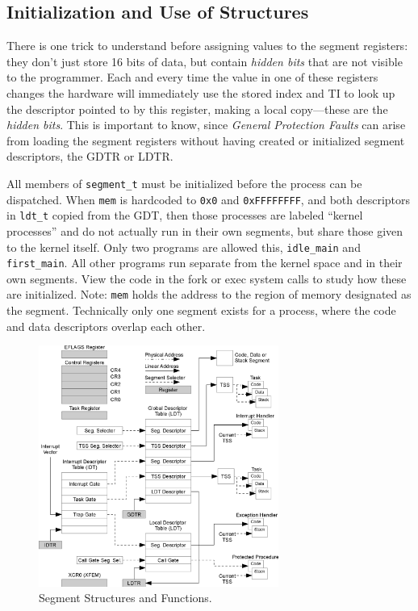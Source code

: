 \documentclass[titlepage]{article}
\begin{document}
% 
%

\subsection{Initialization and Use of Structures}

There is one trick to understand before assigning values to the segment
registers: they don't just store 16 bits of data, but contain \textit{hidden
bits} that are not visible to the programmer. Each and every time the value in
one of these registers changes the hardware will immediately use the stored
index and TI to look up the descriptor pointed to by this register, making a
local copy---these are the \textit{hidden bits}. This is important to know,
since \textit{General Protection Faults} can arise from loading the segment
registers without having created or initialized segment descriptors, the GDTR or
LDTR.

All members of \verb|segment_t| must be initialized before the process can be
dispatched. When \verb|mem| is hardcoded to \verb|0x0| and \verb|0xFFFFFFFF|,
and both descriptors in \verb|ldt_t| copied from the GDT, then those processes
are labeled ``kernel processes'' and do not actually run in their own segments,
but share those given to the kernel itself. Only two programs are allowed this,
\verb|idle_main| and \verb|first_main|. All other programs run separate from the
kernel space and in their own segments. View the code in the fork or exec system
calls to study how these are initialized. Note: \verb|mem| holds the address to
the region of memory designated as the segment. Technically only one segment
exists for a process, where the code and data descriptors overlap each other.

\begin{figure}[!ht]
    \centering
    \includegraphics[width=0.70\textwidth]{images/structures.eps}
    \caption{Segment Structures and Functions.}
\end{figure}
\end{document}
